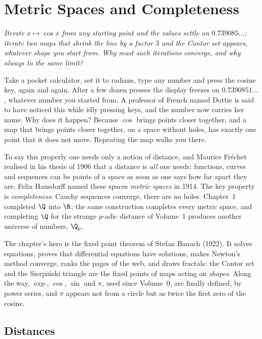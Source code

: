 \chapter{Metric Spaces and Completeness}

\begin{center}\itshape
Iterate $x\mapsto\cos x$ from any starting point and the values settle on $0.739085\ldots$; iterate two maps that shrink
the line by a factor $3$ and the Cantor set appears, whatever shape you start from. Why must such iterations
converge, and why always to the same limit?
\end{center}

Take a pocket calculator, set it to radians, type any number and press the cosine key, again and again. After a few
dozen presses the display freezes on $0.7390851\ldots$, whatever number you started from. A professor of French named
Dottie is said to have noticed this while idly pressing keys, and the number now carries her name. Why does it happen?
Because $\cos$ brings points closer together, and a map that brings points closer together, on a space without holes,
has exactly one point that it does not move. Repeating the map walks you there.

To say this properly one needs only a notion of distance, and Maurice Fr\'echet realised in his thesis of 1906 that a
distance is \emph{all} one needs: functions, curves and sequences can be points of a space as soon as one says how
far apart they are. Felix Hausdorff named these spaces \emph{metric spaces} in 1914. The key property is
\emph{completeness}: Cauchy sequences converge, there are no holes. Chapter~1 completed $\Q$ into $\R$; the same
construction completes every metric space, and completing $\Q$ for the strange $p$-adic distance of Volume~1 produces
another universe of numbers, $\Q_p$.

The chapter's hero is the fixed point theorem of Stefan Banach (1922). It solves equations, proves that differential
equations have solutions, makes Newton's method converge, ranks the pages of the web, and draws fractals: the Cantor
set and the Sierpi\'nski triangle are the fixed points of maps acting on \emph{shapes}. Along the way, $\exp$, $\cos$,
$\sin$ and $\pi$, used since Volume~0, are finally defined, by power series, and $\pi$ appears not from a circle but as
twice the first zero of the cosine.

\section{Distances}

